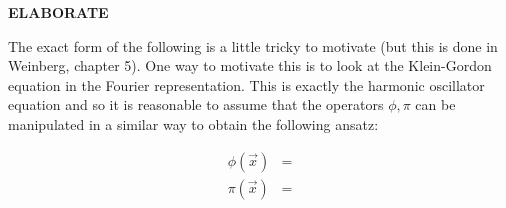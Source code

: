 \documentclass{report}
\theoremstyle{plain}
\theoremstyle{definition}
\theoremstyle{remark}
\newcommand{\elaborate}{{\color{blue} \textbf{ELABORATE}}}
\begin{document}
\elaborate

The exact form of the following is a little tricky to motivate (but this is
done in Weinberg, chapter 5). One way to motivate this is to look at the
Klein-Gordon equation in the Fourier representation. This is exactly the
harmonic oscillator equation and so it is reasonable to assume that the
operators $\phi,\pi$ can be manipulated in a similar way to obtain the
following ansatz:

\begin{align*}
    \phi(\vec x) &= \\
    \pi(\vec x) &=
\end{align*}

%
%
%
%
%
%
%
%
%
%
%
\end{document}
